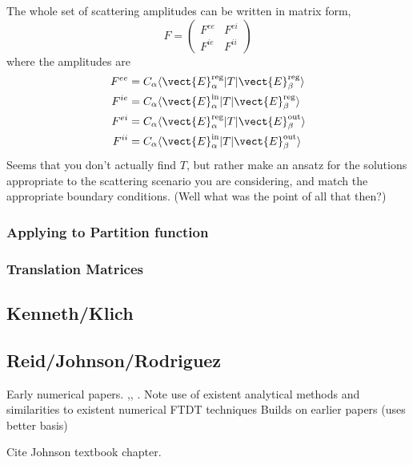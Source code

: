 The whole set of scattering amplitudes can be written in matrix form,
\begin{equation}
F = \left(\begin{array}{cc}
    F^{ee} & F^{ei} \\ F^{ie} & F^{ii}
  \end{array}
  \right)
\end{equation}
where the amplitudes are 
\begin{align}
  F^{ee}& = C_\alpha \langle \vect{E}^{\text{reg}}_\alpha|T|\vect{E}^{\text{reg}}_\beta\rangle\\
  F^{ie}& = C_\alpha \langle \vect{E}^{\text{in}}_\alpha|T|\vect{E}^{\text{reg}}_\beta\rangle\\
  F^{ei}& = C_\alpha \langle \vect{E}^{\text{reg}}_\alpha|T|\vect{E}^{\text{out}}_\beta\rangle\\
  F^{ii}& = C_\alpha \langle \vect{E}^{\text{in}}_\alpha|T|\vect{E}^{\text{out}}_\beta\rangle
\end{align}
Seems that you don't actually find $T$, but rather make an ansatz for the solutions appropriate
 to the scattering scenario you are considering, and match the appropriate boundary conditions.
(Well what was the point of all that then?)

\subsubsection{Applying to Partition function}

\subsubsection{Translation Matrices}


\subsection{Kenneth/Klich}
\cite{Kenneth2006}
\cite{Kenneth2008}

\subsection{Reid/Johnson/Rodriguez}

Early numerical papers.
\cite{Rodriguez2007},\cite{Rodriguez2007a}, \cite{Rodriguez2009}.
  Note use of existent analytical methods and similarities to existent numerical 
FTDT techniques Builds on earlier papers (uses better basis) 

Cite Johnson textbook chapter.\cite{Johnson2011}


